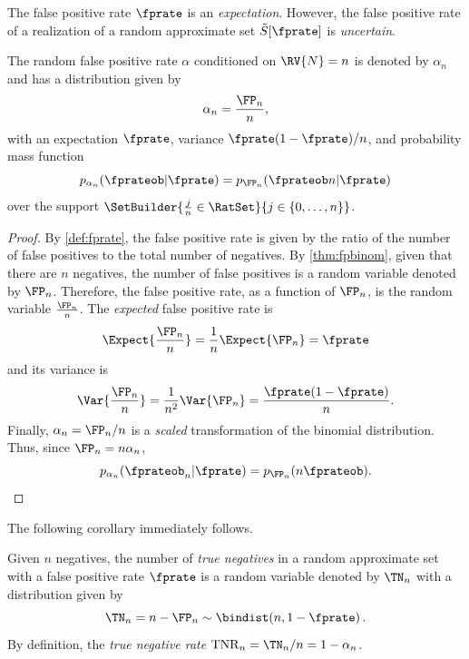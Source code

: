 The false positive rate $\fprate$ is an \emph{expectation}.
However, the false positive rate of a realization of a random approximate set $\tilde{S}[\fprate]$ is \emph{uncertain}.
\begin{theorem}
\label{thm:fpr}
The random false positive rate $\alpha$ conditioned on $\RV{N} = n$ is denoted by $\alpha_n$ and has a distribution given by
\begin{equation}
    \alpha_n = \frac{\FP_n}{n},
\end{equation}
with an expectation $\fprate$, variance $\fprate(1-\fprate) / n$, and probability mass function
\begin{equation}
	p_{\alpha_n}(\fprateob | \fprate) = p_{\FP_n}(\fprateob n | \fprate)
\end{equation}
over the support $\SetBuilder{ \frac{j}{n} \in \RatSet}{j \in \{0,\ldots,n\}}$.
\end{theorem}
\begin{proof}
By \cref{def:fprate}, the false positive rate is given by the ratio of the number of false positives to the total number of negatives.
By \cref{thm:fpbinom}, given that there are $n$ negatives, the number of false positives is a random variable denoted by $\FP_n$.
Therefore, the false positive rate, as a function of $\FP_n$, is the random variable $\frac{\FP_n}{n}$.
The \emph{expected} false positive rate is
\begin{equation}
    \Expect{\frac{\FP_n}{n}} = \frac{1}{n}\Expect{\FP_n} = \fprate
\end{equation}
and its variance is
\begin{equation}
    \Var{\frac{\FP_n}{n}} = \frac{1}{n^2}\Var{\FP_n} = \frac{\fprate(1-\fprate)}{n}.
\end{equation}
Finally, $\alpha_n = \FP_n / n$ is a \emph{scaled} transformation of the binomial distribution.
Thus, since $\FP_n = n \alpha_n$,
\begin{equation}
	p_{\alpha_n}(\fprateob_n | \fprate) = p_{\FP_n}(n \fprateob).
\end{equation}
\end{proof}
The following corollary immediately follows.
\begin{corollary}
	\label{cor:tnbinom}
	Given $n$ negatives, the number of \emph{true negatives} in a random approximate set with a false positive rate $\fprate$ is a random variable denoted by $\TN_n$ with a distribution given by
	\begin{equation}
	\TN_n = n - \FP_n \sim \bindist\!\left(n, 1-\fprate\right).
	\end{equation}
	By definition, the \emph{true negative rate} $\mathrm{TNR}_n = \TN_n / n = 1 - \alpha_n$.
\end{corollary}

